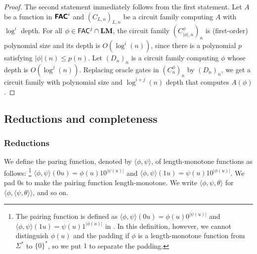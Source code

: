 \documentclass[envcountsame,orivec,oribibl]{llncs}
\begin{document}
\begin{proof}
The second statement immediately follows from the first statement.
Let $A$ be a function in $\text{\bfseries \sffamily \upshape FAC}^i$ and $(C_{L,n})_{L,n}$ be a circuit
family computing $A$ with $\log^i$ depth.
For all $\phi \in \mathsf{FAC}^j \cap \mathbf{LM}$, 
the circuit family $(C^\phi_{|\phi|,n})_n$ is (first-order) polynomial size and its depth is $O(\log^i(n))$,
since there is a polynomial $p$ satisfying $|\phi|(n) \le p(n)$.
Let $(D_n)_n$ is a circuit family computing $\phi$ whose depth is $O(\log^j(n))$.
Replacing oracle gates in $(C^\phi_n)_n$ by $(D_n)_n$, 
we get a circuit family with polynomial size and $\log^{i+j}(n)$ depth
that computes $A(\phi)$.
\end{proof}




\subsection{Reductions and completeness}

\subsubsection{Reductions}
We define the paring function, denoted by $\langle \phi, \psi \rangle$,
of length-monotone functions as follows:%
\footnote{
The pairing function is defined as
$\langle \phi, \psi \rangle(0u) = \phi(u) 0^{|\psi(u)|}$
and 
$\langle \phi, \psi \rangle(1u) = \psi(u) 1^{|\phi(u)|}$ 
in \cite{kawamura2010complexity}.
In this definition, however, we cannot distinguish $\phi(u)$ and the padding
if $\phi$ is a length-monotone function from $\Sigma^*$ to $\{0\}^*$,
so we put $1$ to separate the padding.
}
$\langle \phi, \psi \rangle(0u) = \phi(u) 10^{|\psi(u)|}$ and 
$\langle \phi, \psi \rangle(1u) = \psi(u) 10^{|\phi(u)|}$.
We pad $0$s to make the pairing function length-monotone.
We write $\langle \phi, \psi, \theta \rangle$ 
for $\langle \phi, \langle \psi, \theta \rangle \rangle$, and so on.
\end{document}
